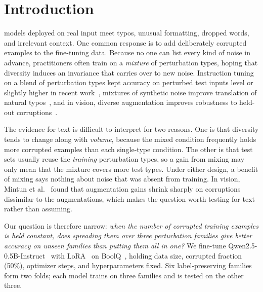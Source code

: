 \documentclass[conference]{IEEEtran}
\begin{document}
\section{Introduction}

 models deployed on real input meet typos, unusual formatting, dropped words, and irrelevant context. One common response is to add deliberately corrupted examples to the fine-tuning data. Because no one can list every kind of noise in advance, practitioners often train on a \emph{mixture} of perturbation types, hoping that diversity induces an invariance that carries over to new noise. Instruction tuning on a blend of perturbation types kept accuracy on perturbed test inputs level or slightly higher in recent work~\cite{alajrami2025noisy}, mixtures of synthetic noise improve translation of natural typos~\cite{karpukhin2019synthetic}, and in vision, diverse augmentation improves robustness to held-out corruptions~\cite{hendrycks2019benchmarking,hendrycks2020augmix}.

The evidence for text is difficult to interpret for two reasons. One is that diversity tends to change along with \emph{volume}, because the mixed condition frequently holds more corrupted examples than each single-type condition. The other is that test sets usually reuse the \emph{training} perturbation types, so a gain from mixing may only mean that the mixture covers more test types. Under either design, a benefit of mixing says nothing about noise that was absent from training. In vision, Mintun et al.~\cite{mintun2021interaction} found that augmentation gains shrink sharply on corruptions dissimilar to the augmentations, which makes the question worth testing for text rather than assuming.

Our question is therefore narrow: \emph{when the number of corrupted training examples is held constant, does spreading them over three perturbation families give better accuracy on unseen families than putting them all in one?} We fine-tune Qwen2.5-0.5B-Instruct~\cite{qwen2025qwen25} with LoRA~\cite{hu2022lora} on BoolQ~\cite{clark2019boolq}, holding data size, corrupted fraction (50\%), optimizer steps, and hyperparameters fixed. Six label-preserving families form two folds; each model trains on three families and is tested on the other three.
\end{document}
